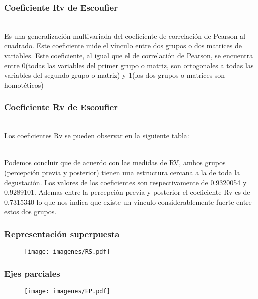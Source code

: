 \documentclass[12pt]{beamer}
\begin{document}
\begin{frame}
\frametitle{Coeficiente Rv de Escoufier}
~\\ Es una generalización multivariada del coeficiente de correlación de Pearson al cuadrado. Este coeficiente mide el vínculo entre dos grupos o dos matrices de variables. Este coeficiente, al igual que el de correlación de Pearson, se encuentra entre 0(todas las variables del primer grupo o matriz, son ortogonales a todas las variables del segundo grupo o matriz) y 1(los dos grupos o matrices son homotéticos)
\end{frame}

\begin{frame}
\frametitle{Coeficiente Rv de Escoufier}
~\\Los coeficientes Rv se pueden observar en la siguiente tabla:
\begin{center}
\end{center}
~\\Podemos concluir que de acuerdo con las medidas de RV, ambos grupos (percepción previa y posterior) tienen una estructura cercana a la de toda la degustación. Los valores de los coeficientes son respectivamente de 0.9320054 y 0.9289101. Ademas entre la percepción previa y posterior el coeficiente Rv es de 0.7315340 lo que nos indica que existe un vinculo considerablemente fuerte entre estos dos grupos.
\end{frame}

\begin{frame}
\frametitle{Representación superpuesta}
\begin{figure}[h]
  \centering
  \texttt{[image: imagenes/RS.pdf]}
\end{figure}
\end{frame}

\begin{frame}
\frametitle{Ejes parciales}
\begin{figure}[h]
  \centering
  \texttt{[image: imagenes/EP.pdf]}
\end{figure}
\end{frame}
\end{document}
